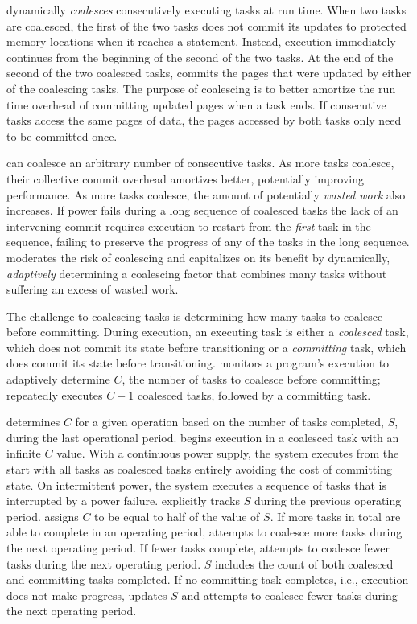 \sys dynamically {\em coalesces} consecutively executing tasks at run time. When two tasks are coalesced, the first of the two tasks does not commit its updates to protected memory locations when it reaches a \transition statement. Instead, execution immediately continues from the beginning of the second of the two tasks. At the end of the second of the two coalesced tasks, \sys commits the pages that were updated by either of the coalescing tasks. The purpose of coalescing is to better amortize the run time overhead of committing updated pages when a task ends. If consecutive tasks access the same pages of data, the pages accessed by both tasks only need to be committed once.  

\sys can coalesce an arbitrary number of consecutive tasks. As more tasks coalesce, their collective commit overhead amortizes better, potentially improving performance. As more tasks coalesce, the amount of potentially {\em wasted work} also increases. If power fails during a long sequence of coalesced tasks the lack of an intervening commit requires execution to restart from the {\em first} task in the sequence, failing to preserve the progress of any of the tasks in the long sequence. \sys moderates the risk of coalescing and capitalizes on its benefit by dynamically, \emph{adaptively} determining a coalescing factor that combines many tasks without suffering an excess of wasted work. 

The challenge to coalescing tasks is determining how many tasks to coalesce before committing. During execution, an executing task is either a {\em coalesced} task, which does not commit its state before transitioning or a {\em committing} task, which does commit its state before transitioning. \sys monitors a program's execution to adaptively determine $C$, the number of tasks to coalesce before committing; \sys repeatedly executes $C-1$ coalesced tasks, followed by a committing task. 

\sys determines $C$ for a given operation based on the number of tasks completed, $S$, during the last operational period. \sys begins execution in a coalesced task with an infinite $C$ value. With a continuous power supply, the system executes from the start with all tasks as coalesced tasks entirely avoiding the cost of committing state. On intermittent power, the system executes a sequence of tasks that is interrupted by a power failure. \sys explicitly tracks $S$ during the previous operating period. \sys assigns $C$ to be equal to half of the value of $S$. If more tasks in total are able to complete in an operating period, \sys attempts to coalesce more tasks during the next operating period. If fewer tasks complete, \sys attempts to coalesce fewer tasks during the next operating period. $S$ includes the count of both coalesced and committing tasks completed. If no committing task completes, i.e., execution does not make progress, \sys updates $S$ and attempts to coalesce fewer tasks during the next operating period.

